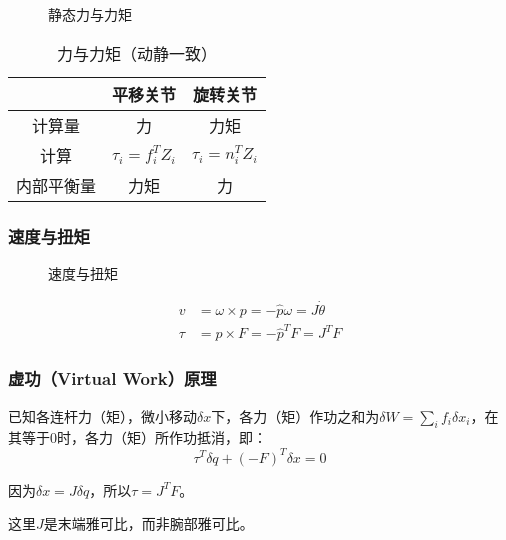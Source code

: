 \documentclass[
12pt, %
a4paper, 
oneside, %
headinclude,footinclude, %
]{scrartcl}
\begin{document}
\begin{figure}[H]
\centering
{} \quad
{} \quad
{}
\caption[静态力与力矩]{静态力与力矩}
\end{figure}

\begin{table}[H]
\centering
\begin{tabular}{c|cc}
\hline
& 平移关节 & 旋转关节 \\
\hline
计算量 & 力 & 力矩 \\
计算 & $ \tau_i = f_i^T Z_i $ & $ \tau_i = n_i^T Z_i $ \\
内部平衡量 & 力矩 & 力 \\
\hline
\end{tabular}
\caption{力与力矩（动静一致）}
\end{table}
\subsubsection{速度与扭矩}
\begin{figure}[H]
\centering
\subfloat[角速度与线速度]{\texttt{[image: wv]}} \quad
\subfloat[力与扭矩]{\texttt{[image: ft]}}
\caption[速度与扭矩]{速度与扭矩}
\end{figure}

\begin{align*}
v &= \omega \times p = -\hat{p} \omega = J \dot{\theta} \\
\tau &= p \times F = -\hat{p}^T F = J^T F
\end{align*}
\subsubsection{虚功（Virtual Work）原理}
已知各连杆力（矩），微小移动$ \delta x $下，各力（矩）作功之和为$ \delta W = \sum_i f_i \delta x_i $，在其等于$ 0 $时，各力（矩）所作功抵消，即：
$$ \tau^T \delta q + (-F)^T \delta x = 0 $$

因为$ \delta x = J \delta q $，所以$ \tau = J^T F $。

这里$ J $是末端雅可比，而非腕部雅可比。
\end{document}
